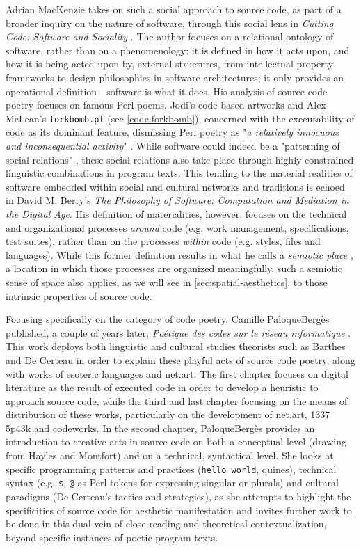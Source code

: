 Adrian MacKenzie takes on such a social approach to source code, as part of a broader inquiry on the nature of software, through this social lens in \emph{Cutting Code: Software and Sociality} \citep{mackenzie_cutting_2006}. The author focuses on a relational ontology of software, rather than on a phenomenology: it is defined in how it acts upon, and how it is being acted upon by, external structures, from intellectual property frameworks to design philosophies in software architectures; it only provides an operational definition—software is what it does. His analysis of source code poetry focuses on famous Perl poems, Jodi's code-based artworks and Alex McLean's \lstinline{forkbomb.pl} (see \ref{code:forkbomb}), concerned with the executability of code as its dominant feature, dismissing Perl poetry as "\emph{a relatively innocuous and inconsequential activity}" \citep{mackenzie_cutting_2006}. While software could indeed be a "patterning of social relations" \citep{mackenzie_cutting_2006}, these social relations also take place through highly-constrained linguistic combinations in program texts. This tending to the material realities of software embedded within social and cultural networks and traditions is echoed in David M. Berry's \emph{The Philosophy of Software: Computation and Mediation in the Digital Age}. His definition of materialities, however, focuses on the technical and organizational processes \emph{around} code (e.g. work management, specifications, test suites), rather than on the processes \emph{within} code (e.g. styles, files and languages). While this former definition results in what he calls a \emph{semiotic place} \citep{berry_philosophy_2011}, a location in which those processes are organized meaningfully, such a semiotic sense of space also applies, as we will see in \ref{sec:spatial-aesthetics}, to those intrinsic properties of source code.

Focusing specifically on the category of code poetry, Camille PaloqueBergès published, a couple of years later, \emph{Poétique des codes sur le réseau informatique} \citep{paloque-berges_poetique_2009}. This work deploys both linguistic and cultural studies theorists such as Barthes and De Certeau in order to explain these playful acts of source code poetry, along with works of esoteric languages and net.art. The first chapter focuses on digital literature as the result of executed code in order to develop a heuristic to approach source code, while the third and last chapter focusing on the means of distribution of these works, particularly on the development of net.art, 1337 5p43k and codeworks. In the second chapter, PaloqueBergès provides an introduction to creative acts in source code on both a conceptual level (drawing from Hayles and Montfort) and on a technical, syntactical level. She looks at specific programming patterns and practices (\lstinline{hello world}, quines), technical syntax (e.g. \lstinline{$}, \lstinline{@} as Perl tokens for expressing singular or plurals) and cultural paradigms (De Certeau's tactics and strategies), as she attempts to highlight the specificities of source code for aesthetic manifestation and invites further work to be done in this dual vein of close-reading and theoretical contextualization, beyond specific instances of poetic program texts.

